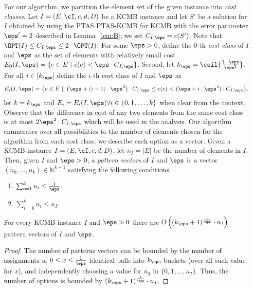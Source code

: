 For our algorithm, we partition the element set of the given instance into {\em cost classes}. %
Let $I =  (E,\cI,c,d,D)$ be a KCMB instance and let $S'$ be a solution for $I$ obtained by using the PTAS PTAS-KCMB for KCMB with the error parameter $\eps'  = 2$ %
described in Lemma~\ref{lem:B}; we set $C_{I,\eps} = c(S')$. Note  that %
$\OPT(I) \leq C_{I,\eps} \leq 2 \cdot \OPT(I)$.  For some $\eps>0$, define the $0$-th {\em cost class} of $I$ and $\eps$ as the set of elements with relatively small cost $E_0(I,\eps) = \{e \in E~|~ c(e) < \eps \cdot C_{I,\eps}\}$. Second, let $k_{\eps} = \ceil{\frac{1-\eps}{\eps^2}}$. For all $i \in [k_{\eps}]$ define the $i$-th cost class of $I$ and $\eps$ as \begin{equation}
	\label{eq:class}
	E_i(I,\eps) = \big\{e \in E~|~ \left(\eps+(i-1) \cdot \eps^2\right) \cdot C_{I,\eps} \leq c(e) < (\eps+i \cdot \eps^2) \cdot C_{I,\eps} \big\}. 
\end{equation} let $k = k_{\eps}$ and $E_i = E_i(I,\eps) \forall i \in \{0,1,\ldots,k\}$ when clear from the context. Observe that the difference in cost of any two elements from the same cost class is at most $2\eps^{2} \cdot C_{I,\eps}$ which will be used in the analysis. Our algorithm enumerates over all possibilities to the number of elements chosen for the algorithm from each cost class; we describe each option as a vector. Given a KCMB instance $I =  (E,\cI,c,d,D)$, let $n_I = |E|$ be the number of elements in $I$. Then, given $I$ and $\eps>0$, a {\em pattern vectors} of $I$ and $\eps$ is a vector $(n_0, \ldots, n_k) \in \mathbb{N}^{k+1}$ satisfying the following conditions. \begin{enumerate}
	\item $\sum^{k}_{i = 1} n_i \leq \frac{1}{\eps}$.
	\item $\sum^{k}_{i = 0} n_i \leq n_I$.   
\end{enumerate}	\begin{lemma}
	\label{lem:countK}
	For every \textnormal{KCMB} instance $I$ and $\eps>0$ there are $O\left( (k_{\eps}+1)^{\frac{1}{\eps}} \cdot n_I\right)$ pattern vectors of $I$ and $\eps$. 
\end{lemma}

\begin{proof}
	The number of patterns vectors can be bounded by the number of assignments of $0 \leq x \leq \frac{1}{\eps}$ identical balls into $k_{\eps}$ buckets (over all such  value for $x$), and independently choosing a value for $n_0$ in $\{0,1,\ldots,n_I\}$. Thus, the number of options is bounded by $ (k_{\eps}+1)^{\frac{1}{\eps}} \cdot n_I$.  
\end{proof} 

